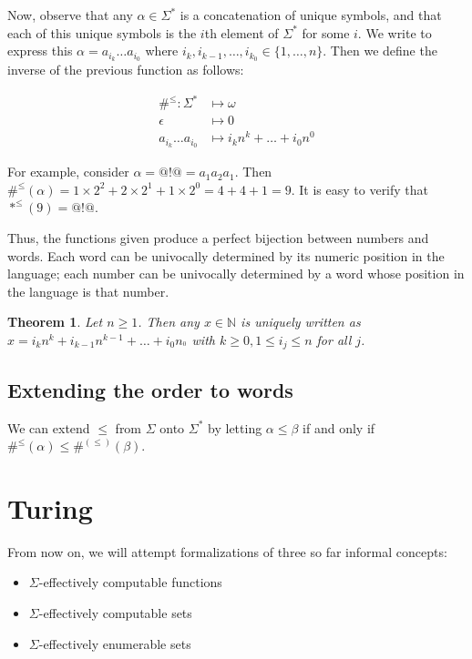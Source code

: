 \documentclass[a4paper, 12pt]{article}
\newtheorem{theorem}{Theorem}
\newtheorem{theorem}{Theorem}
\begin{document}
Now, observe that any $\alpha \in \Sigma^{*}$ is a concatenation of unique
symbols, and that each of this unique symbols is the $i$th element of
$\Sigma^{*}$ for some $i$. We write to express this $\alpha = a_{i_k}\ldots
a_{i_0}$ where $i_{k}, i_{k-1}, \ldots, i_{k_0} \in \{ 1, \ldots, n\}$. Then we
define the inverse of the previous function as follows: 

\begin{align*}
    \#^{\leq} : \Sigma^{*} &\mapsto \omega \\ 
    \epsilon & \mapsto 0 \\ 
    a_{i_k} \ldots a_{i_0} &\mapsto i_k n^{k} + \ldots + i_0 n^0
\end{align*}

For example, consider $\alpha = @!@ = a_{1} a_2 a_1$. Then $\#^{\leq}( \alpha )
= 1 \times 2^2 + 2 \times 2^1 + 1 \times 2^0 = 4 + 4 + 1 = 9$. It is easy to
verify that $*^{\leq}( 9 ) = @!@$.

Thus, the functions given produce a perfect bijection between numbers and words.
Each word can be univocally determined by its numeric position in the language;
each number can be univocally determined by a word whose position in the
language is that number. 

\begin{theorem}
    Let $n \geq 1$. Then any $x \in \mathbb{N}$ is uniquely written as $x = i_k
    n^k + i_{k-1} n^{k-1} + \ldots + i_0 n_^0$ with $k \geq 0, 1 \leq i_j \leq
    n$ for all $j$.
\end{theorem}

\subsection{Extending the order to words}

We can extend $\leq$ from $\Sigma$ onto $\Sigma^{*}$ by letting $\alpha \leq
\beta $ if and only if $\#^{\leq}(\alpha) \leq \#^{(\leq)}(\beta )$.

\pagebreak






\section{Turing}

From now on, we will attempt formalizations of three so far informal concepts: 

\begin{itemize}
    \item $\Sigma$-effectively computable functions
    \item $\Sigma$-effectively computable sets
    \item $\Sigma$-effectively enumerable sets
\end{itemize}
\end{document}
